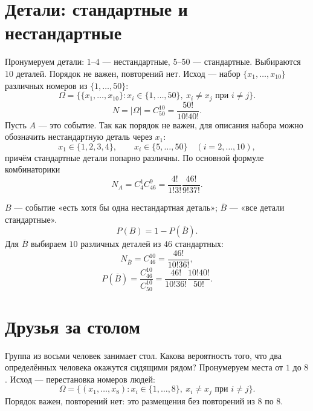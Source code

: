 


\section*{Детали: стандартные и нестандартные}
Пронумеруем детали: $1$--$4$ --- нестандартные, $5$--$50$ --- стандартные.
Выбираются $10$ деталей. Порядок не важен, повторений нет.
Исход --- набор $\{x_1,\ldots,x_{10}\}$ различных номеров из $\{1,\ldots,50\}$:
\[
 \Omega=\bigl\{\{x_1,\ldots,x_{10}\}:x_i\in\{1,\ldots,50\},\
 x_i\ne x_j\text{ при }i\ne j\bigr\}.
\]
\[
 N=|\Omega|=C_{50}^{10}=\frac{50!}{10!40!}.
\]
Пусть $A$ --- это событие. Так как порядок не важен, для описания набора
можно обозначить нестандартную деталь через $x_1$:
\[
 x_1\in\{1,2,3,4\},\qquad x_i\in\{5,\ldots,50\}\quad(i=2,\ldots,10),
\]
причём стандартные детали попарно различны. По основной формуле комбинаторики
\[
 N_A=C_4^1C_{46}^9
 =\frac{4!}{1!3!}\frac{46!}{9!37!}.
\]

$B$ --- событие «есть хотя бы одна нестандартная деталь»;
$\overline B$ --- «все детали стандартные».
\[
 P(B)=1-P(\overline B).
\]
Для $\overline B$ выбираем $10$ различных деталей из $46$ стандартных:
\[
 N_{\overline B}=C_{46}^{10}=\frac{46!}{10!36!},
\]
\[
 P(\overline B)=\frac{C_{46}^{10}}{C_{50}^{10}}
 =\frac{46!}{10!36!}\frac{10!40!}{50!}.
\]

\section*{Друзья за столом}
Группа из восьми человек занимает стол. Какова вероятность того,
что два определённых человека окажутся сидящими рядом?
Пронумеруем места от $1$ до $8$. Исход --- перестановка номеров людей:
\[
 \Omega=\{(x_1,\ldots,x_8):x_i\in\{1,\ldots,8\},\
 x_i\ne x_j\text{ при }i\ne j\}.
\]
Порядок важен, повторений нет: это размещения без повторений из $8$ по $8$.

